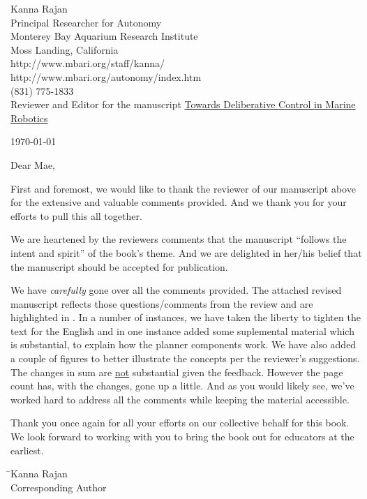 \documentclass[11pt,twoside]{article}
\begin{document}
\thispagestyle{empty}
\pagestyle{empty}
\setlength{\parindent}{0pt} 
\setlength{\parskip}{2ex}


\small{Kanna Rajan}\\
\small{Principal Researcher for Autonomy}\\
\small{Monterey Bay Aquarium Research Institute}\\
\small{Moss Landing, California}\\
\small{http://www.mbari.org/staff/kanna/}\\
\small{http://www.mbari.org/autonomy/index.htm}\\
\small{(831) 775-1833}\\

Reviewer and Editor for the manuscript \textsf{\underline{Towards Deliberative Control in Marine Robotics}}\\

\begin{flushright}
  \today
\end{flushright}

Dear Mae,

First and foremost, we would like to thank the reviewer of our
manuscript above for the extensive and valuable comments provided. And
we thank you for your efforts to pull this all together.

We are heartened by the reviewers comments that the manuscript
``follows the intent and spirit'' of the book's theme. And we are
delighted in her/his belief that the manuscript should be accepted for
publication.

We have \emph{carefully} gone over all the comments provided. The
attached revised manuscript reflects those questions/comments from the
review and are highlighted in  . In a number of
instances, we have taken the liberty to tighten the text for the
English and in one instance added some suplemental material which is
substantial, to explain how the \eu planner components work. We have
also added a couple of figures to better illustrate the concepts per
the reviewer's suggestions. The changes in sum are \underline{not}
substantial given the feedback. However the page count has, with the
changes, gone up a little. And as you would likely see, we've worked
hard to address all the comments while keeping the material
accessible.

Thank you once again for all your efforts on our collective behalf for
this book. We look forward to working with you to bring the book out
for educators at the earliest.


\vspace{+2cm}
\begin{tabbing}
\hspace{+10cm}\=\small{Kanna Rajan}\\
\>\small{Corresponding Author}\\
\end{tabbing}
\end{document}

